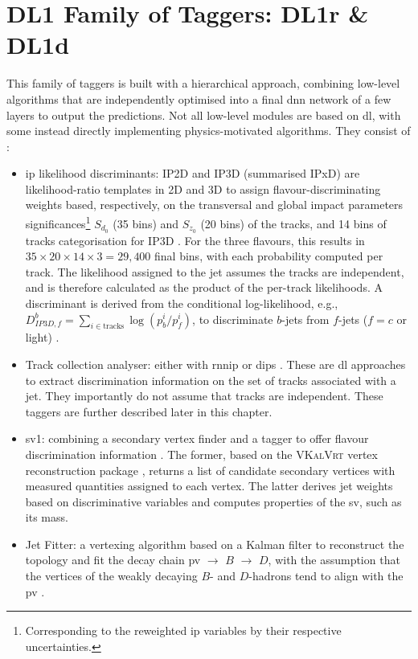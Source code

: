 \section{DL1 Family of Taggers: DL1r \& DL1d}
This family of taggers is built with a hierarchical approach, combining low-level algorithms that are independently optimised into a final \gls{dnn} network of a few layers to output the predictions. Not all low-level modules are based on \gls{dl}, with some instead directly implementing physics-motivated algorithms. They consist of \cite{atlas:FTAGRUN2, Paganini:2289214}:
\begin{itemize}
  \item \gls{ip} likelihood discriminants: IP2D and IP3D (summarised IPxD) are likelihood-ratio templates in 2D and 3D to assign flavour-discriminating weights based, respectively, on the transversal and global impact parameters significances\footnote{Corresponding to the reweighted \gls{ip} variables by their respective uncertainties.} $S_{d_0}$ (35 bins) and $S_{z_0}$ (20 bins) of the tracks, and 14 bins of tracks categorisation for IP3D \cite{ATLAS:2017bcq}. For the three flavours, this results in $35 \times 20 \times 14 \times 3 = 29,400$ final bins, with each probability computed per track. The likelihood assigned to the jet assumes the tracks are independent, and is therefore calculated as the product of the per-track likelihoods. A discriminant is derived from the conditional log-likelihood, e.g., $D^b_{IP3D,f} = \sum_{i \in \textrm{tracks}} \log (p_b^i / p_f^i)$, to discriminate $b$-jets from $f$-jets ($f= c$ or light) \cite{ATL-PHYS-PUB-2015-022}.
  \item Track collection analyser: either with \gls{rnnip} \cite{ATL-PHYS-PUB-2017-003} or \gls{dips} \cite{ATL-PHYS-PUB-2020-014}. These are \gls{dl} approaches to extract discrimination information on the set of tracks associated with a jet. They importantly do not assume that tracks are independent. These taggers are further described later in this chapter. 
  \item \gls{sv1}: combining a secondary vertex finder and a tagger to offer flavour discrimination information \cite{atlas:FTAGRUN2}. The former, based on the \textsc{VKalVrt} vertex reconstruction package \cite{Kostyukhin:685551}, returns a list of candidate secondary vertices with measured quantities assigned to each vertex. The latter derives jet weights based on discriminative variables and computes properties of the \gls{sv}, such as its mass. 
  \item Jet Fitter: a vertexing algorithm based on a Kalman filter to reconstruct the topology and fit the decay chain \gls{pv} $\rightarrow$ $B$ $\rightarrow$ $D$, with the assumption that the vertices of the weakly decaying $B$- and $D$-hadrons tend to align with the \gls{pv} \cite{atlas:FTAGRUN2, ATL-PHYS-PUB-2018-025}. 
\end{itemize}

